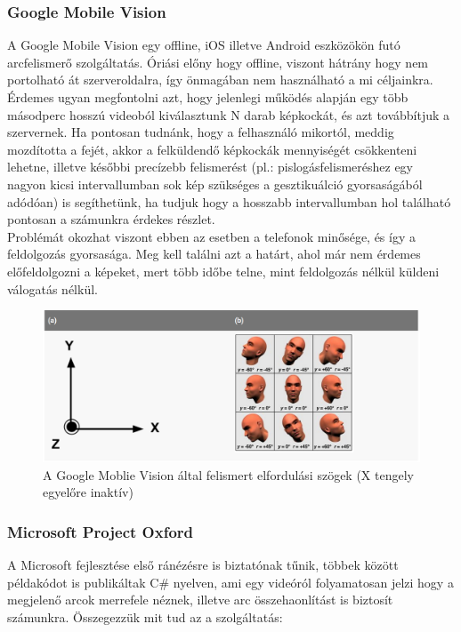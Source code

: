 \subsubsection{Google Mobile Vision}
A Google Mobile Vision\cite{GMV} egy offline, iOS illetve Android eszközökön futó arcfelismerő szolgáltatás. Óriási előny hogy offline, viszont hátrány hogy nem portolható át szerveroldalra, így önmagában nem használható a mi céljainkra. Érdemes ugyan megfontolni azt, hogy jelenlegi működés alapján egy több másodperc hosszú videoból kiválasztunk N darab képkockát, és azt továbbítjuk a szervernek. Ha pontosan tudnánk, hogy a felhasználó mikortól, meddig mozdította a fejét, akkor a felküldendő képkockák mennyiségét csökkenteni lehetne, illetve későbbi precízebb felismerést (pl.: pislogásfelismeréshez egy nagyon kicsi intervallumban sok kép szükséges a gesztikuálció gyorsaságából adódóan) is segíthetünk, ha tudjuk hogy a hosszabb intervallumban hol található pontosan a számunkra érdekes részlet.
\\Problémát okozhat viszont ebben az esetben a telefonok minősége, és így a feldolgozás gyorsasága. Meg kell találni azt a határt, ahol már nem érdemes előfeldolgozni a képeket, mert több időbe telne, mint feldolgozás nélkül küldeni válogatás nélkül.
\begin{figure}[h]
  \includegraphics[scale=0.5]{img/gmv}
    \caption{A Google Moblie Vision által felismert elfordulási szögek (X tengely egyelőre inaktív)  \cite{GMV_ANGLES}}
\end{figure}

\subsubsection{Microsoft Project Oxford}
A Microsoft fejlesztése első ránézésre is biztatónak tűnik, többek között példakódot is publikáltak C\# nyelven, ami egy videóról folyamatosan jelzi hogy a megjelenő arcok merrefele néznek, illetve arc összehaonlítást is biztosít számunkra. Összegezzük mit tud az a szolgáltatás:

